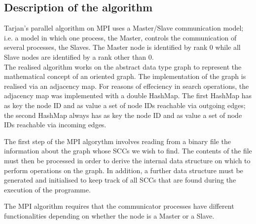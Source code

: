 \label{alg:mpi_only}
\subsection{Description of the algorithm}
Tarjan's parallel algorithm on MPI uses a Master/Slave communication model; i.e. a model in which one process, the Master, controls the communication of several processes, the Slaves. The Master node is identified by rank 0 while all Slave nodes are identified by a rank other than 0. \\
The realised algorithm works on the abstract data type graph to represent the mathematical concept of an oriented graph. The implementation of the graph is realised via an adjacency map. 
For reasons of effeciency in search operations, the adjacency map was implemented with a double HashMap. The first HashMap has as key the node ID and as value a set of node IDs reachable via outgoing edges; the second HashMap always has as key the node ID and as value a set of node IDs reachable via incoming edges.

The first step of the MPI algorythm involves reading from a binary file the information about the graph whose SCCs we wish to find. The contents of the file must then be processed in order to derive the internal data structure on which to perform operations on the graph. In addition, a further data structure must be generated and initialised to keep track of all SCCs that are found during the execution of the programme.

The MPI algorithm requires that the communicator processes have different functionalities depending on whether the node is a Master or a Slave. 

